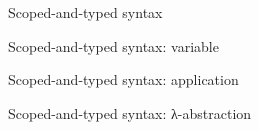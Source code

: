 \documentclass[aspectratio=169]{beamer}
\begin{document}






\begin{frame}{Scoped-and-typed syntax}
\end{frame}

\begin{frame}{Scoped-and-typed syntax: variable}
  \begin{minipage}[t]{.45\textwidth}
  \end{minipage}\hfill
  \begin{minipage}[t]{.45\textwidth}
  \begin{mathpar}
  \end{mathpar}
  \end{minipage}
\end{frame}

\begin{frame}{Scoped-and-typed syntax: application}
  \begin{minipage}[t]{.45\textwidth}
  \end{minipage}\hfill
  \begin{minipage}[t]{.45\textwidth}
  \begin{mathpar}
  \end{mathpar}
  \end{minipage}
\end{frame}


\begin{frame}{Scoped-and-typed syntax: λ-abstraction}
  \begin{minipage}[t]{.45\textwidth}
  \end{minipage}\hfill
  \begin{minipage}[t]{.45\textwidth}
  \begin{mathpar}
  \end{mathpar}
  \end{minipage}
\end{frame}
\end{document}
